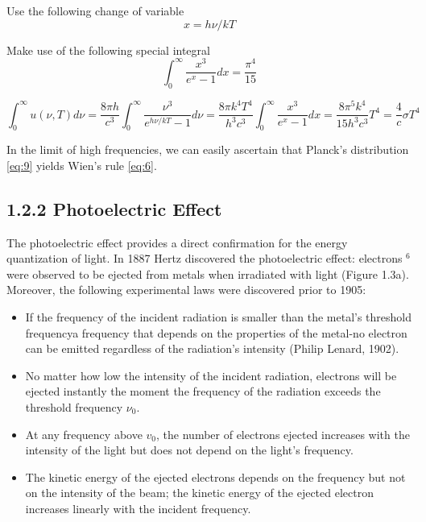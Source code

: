 \documentclass[10pt]{article}
\begin{document}
    Use the following change of variable
    \begin{equation} \label{eq:10.1}
        x=h \nu / k T
    \end{equation}

    Make use of the following special integral
    \begin{equation} \label{eq:10.2}
        \int_0^{\infty} \frac{x^3}{e^x - 1} dx = \frac{\pi^4}{15}
    \end{equation}
    
    \begin{equation} \label{eq:11}
    \int_{0}^{\infty} u(\nu, T) d \nu=\frac{8 \pi h}{c^{3}} \int_{0}^{\infty} \frac{\nu^{3}}{e^{h \nu / k T}-1} d \nu=\frac{8 \pi k^{4} T^{4}}{h^{3} c^{3}} \int_{0}^{\infty} \frac{x^{3}}{e^{x}-1} d x=\frac{8 \pi^{5} k^{4}}{15 h^{3} c^{3}} T^{4}=\frac{4}{c} \sigma T^{4} 
    \end{equation}

    In the limit of high frequencies, we can easily ascertain that Planck's distribution \ref{eq:9} yields Wien's rule \ref{eq:6}.





\subsection*{1.2.2 Photoelectric Effect}
The photoelectric effect provides a direct confirmation for the energy quantization of light. In 1887 Hertz discovered the photoelectric effect: electrons ${ }^{6}$ were observed to be ejected from metals when irradiated with light (Figure 1.3a). Moreover, the following experimental laws were discovered prior to 1905:

\begin{itemize}
  \item If the frequency of the incident radiation is smaller than the metal's threshold frequencya frequency that depends on the properties of the metal-no electron can be emitted regardless of the radiation's intensity (Philip Lenard, 1902).
  \item No matter how low the intensity of the incident radiation, electrons will be ejected instantly the moment the frequency of the radiation exceeds the threshold frequency $\nu_{0}$.
  \item At any frequency above $v_{0}$, the number of electrons ejected increases with the intensity of the light but does not depend on the light's frequency.
  \item The kinetic energy of the ejected electrons depends on the frequency but not on the intensity of the beam; the kinetic energy of the ejected electron increases linearly with the incident frequency.
\end{itemize}
\end{document}
